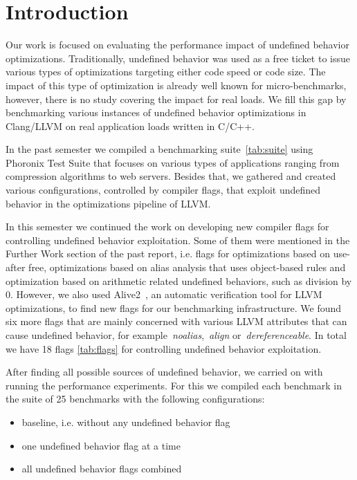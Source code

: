 \section{Introduction}

Our work is focused on evaluating the performance impact of undefined behavior
optimizations. Traditionally, undefined behavior was used as a free ticket to
issue various types of optimizations targeting either code speed or code size.
The impact of this type of optimization is already well known for
micro-benchmarks, however, there is no study covering the impact for real loads.
We fill this gap by benchmarking various instances of undefined behavior
optimizations in Clang/LLVM on real application loads written in C/C++.

In the past semester we compiled a benchmarking suite~\ref{tab:suite} using
Phoronix Test Suite that focuses on various types of applications ranging from
compression algorithms to web servers. Besides that, we gathered and created
various configurations, controlled by compiler flags, that exploit undefined
behavior in the optimizations pipeline of LLVM.

In this semester we continued the work on developing new compiler flags for
controlling undefined behavior exploitation. Some of them were mentioned in the
Further Work section of the past report, i.e. flags for optimizations based on
use-after free, optimizations based on alias analysis that uses object-based
rules and optimization based on arithmetic related undefined behaviors, such as
division by 0. However, we also used Alive2~\cite{lopes2021alive2}, an automatic
verification tool for LLVM optimizations, to find new flags for our benchmarking
infrastructure. We found six more flags that are mainly concerned with various
LLVM attributes that can cause undefined behavior, for
example~\textit{noalias},~\textit{align} or~\textit{dereferenceable}. In total
we have 18 flags \ref{tab:flags} for controlling undefined behavior exploitation.

After finding all possible sources of undefined behavior, we carried on with
running the performance experiments. For this we compiled each benchmark in the
suite of 25 benchmarks with the following configurations:
\begin{itemize}
  \item baseline, i.e. without any undefined behavior flag
  \item one undefined behavior flag at a time
  \item all undefined behavior flags combined
\end{itemize}

